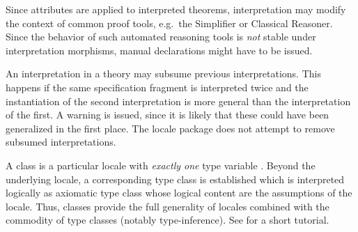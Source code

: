 \begin{isabellebody}
\begin{isamarkuptext}
\begin{description}
  \end{description}

  \begin{warn}
    Since attributes are applied to interpreted theorems,
    interpretation may modify the context of common proof tools, e.g.\
    the Simplifier or Classical Reasoner.  Since the behavior of such
    automated reasoning tools is \emph{not} stable under
    interpretation morphisms, manual declarations might have to be
    issued.
  \end{warn}

  \begin{warn}
    An interpretation in a theory may subsume previous
    interpretations.  This happens if the same specification fragment
    is interpreted twice and the instantiation of the second
    interpretation is more general than the interpretation of the
    first.  A warning is issued, since it is likely that these could
    have been generalized in the first place.  The locale package does
    not attempt to remove subsumed interpretations.
  \end{warn}%
\end{isamarkuptext}%
\isamarkuptrue%
%
\isamarkuptrue%
%
\begin{isamarkuptext}%
A class is a particular locale with \emph{exactly one} type variable
  \isa{{\isasymalpha}}.  Beyond the underlying locale, a corresponding type class
  is established which is interpreted logically as axiomatic type
  class \cite{Wenzel:1997:TPHOL} whose logical content are the
  assumptions of the locale.  Thus, classes provide the full
  generality of locales combined with the commodity of type classes
  (notably type-inference).  See \cite{isabelle-classes} for a short
  tutorial.


\end{isamarkuptext}
\end{isabellebody}
